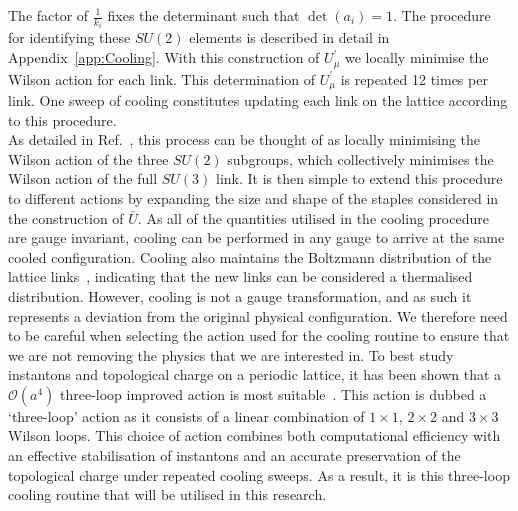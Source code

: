 The factor of $\frac{1}{k_i}$ fixes the determinant such that $\det(a_i)=1$. The procedure for identifying these $SU(2)$ elements is described in detail in Appendix~\ref{app:Cooling}. With this construction of $U_\mu^\prime$ we locally minimise the Wilson action for each link. This determination of $U_\mu^\prime$ is repeated 12 times per link. One sweep of cooling constitutes updating each link on the lattice according to this procedure.\\

As detailed in Ref.~\cite{Bonnet:2000dc}, this process can be thought of as locally minimising the Wilson action of the three $SU(2)$ subgroups, which collectively minimises the Wilson action of the full $SU(3)$ link. It is then simple to extend this procedure to different actions by expanding the size and shape of the staples considered in the construction of $\bar{U}$. As all of the quantities utilised in the cooling procedure are gauge invariant, cooling can be performed in any gauge to arrive at the same cooled configuration. Cooling also maintains the Boltzmann distribution of the lattice links~\cite{Cabibbo:1982zn}, indicating that the new links can be considered a thermalised distribution. However, cooling is not a gauge transformation, and as such it represents a deviation from the original physical configuration. We therefore need to be careful when selecting the action used for the cooling routine to ensure that we are not removing the physics that we are interested in. To best study instantons and topological charge on a periodic lattice, it has been shown that a $\mathcal{O}(a^4)$ three-loop  improved action is most suitable~\cite{BilsonThompson:2002jk}. This action is dubbed a `three-loop' action as it consists of a linear combination of $1\times 1$, $2\times 2$ and $3\times 3$ Wilson loops. This choice of action combines both computational efficiency with an effective stabilisation of instantons and an accurate preservation of the topological charge under repeated cooling sweeps. As a result, it is this three-loop cooling routine that will be utilised in this research.

